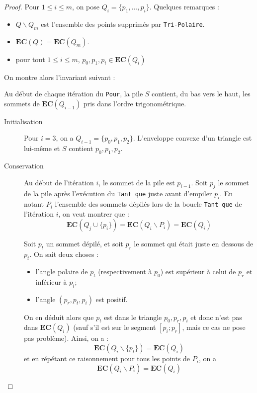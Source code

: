 \begin{proof}
Pour $1\leq i \leq m$, on pose $Q_i=\{p_1,...,p_i\}$. Quelques remarques :
\begin{itemize}
\item $Q\backslash Q_m$ est l'ensemble des points supprimés par {\tt Tri-Polaire}.
\item $\mathbf{EC}(Q)=\mathbf{EC}(Q_m)$.
\item pour tout $1\leq i \leq m$, $p_0,p_1,p_i \in\mathbf{EC}(Q_i)$ 
\end{itemize}

On montre alors l'invariant suivant :

\begin{center}
\og Au début de chaque itération du {\tt Pour},  la pile $S$ contient, du bas vers le haut, les sommets de $\mathbf{EC}(Q_{i-1})$ pris dans l'ordre trigonométrique.\fg{} 
\end{center}

\begin{description}
\item[Initialisation] Pour $i=3$, on a $Q_{i-1}=\{p_0,p_1,p_2\}$. L'enveloppe convexe d'un triangle est lui-même et $S$ contient $p_0,p_1,p_2$.

\item[Conservation] Au début de l'itération $i$, le sommet de la pile est $p_{i-1}$. Soit $p_j$ le sommet de la pile après l'exécution du {\tt Tant que} juste avant d'empiler $p_i$. En notant $P_i$ l'ensemble des sommets dépilés lors de la boucle {\tt Tant que} de l'itération $i$, on veut montrer que :
\begin{equation}\label{conservation}
\mathbf{EC}(Q_j \cup \{ p_i\}) = \mathbf{EC}(Q_i\backslash P_i) = \mathbf{EC}(Q_i)
\end{equation}

Soit $p_t$ un sommet dépilé, et soit $p_r$ le sommet qui était juste en dessous de $p_t$. On sait deux choses :
\begin{itemize}
\item l'angle polaire de $p_t$ (respectivement à $p_0$) est supérieur à celui de $p_r$ et inférieur à $p_i$;\\
\item l'angle $(p_r,p_t,p_i)$ est positif.
\end{itemize}
On en déduit alors que $p_t$ est dans le triangle $p_0,p_r,p_i$ et donc n'est pas dans $\mathbf{EC}(Q_i)$ (sauf s'il est sur le segment $[p_i;p_r]$, mais ce cas ne pose pas problème). Ainsi, on a :
$$
\mathbf{EC}(Q_i\backslash \{p_t\}) = \mathbf{EC}(Q_i)
$$
et en répétant ce raisonnement pour tous les points de $P_i$, on a 
$$
\mathbf{EC}(Q_i\backslash P_i) = \mathbf{EC}(Q_i)
$$


\end{description}
\end{proof}
